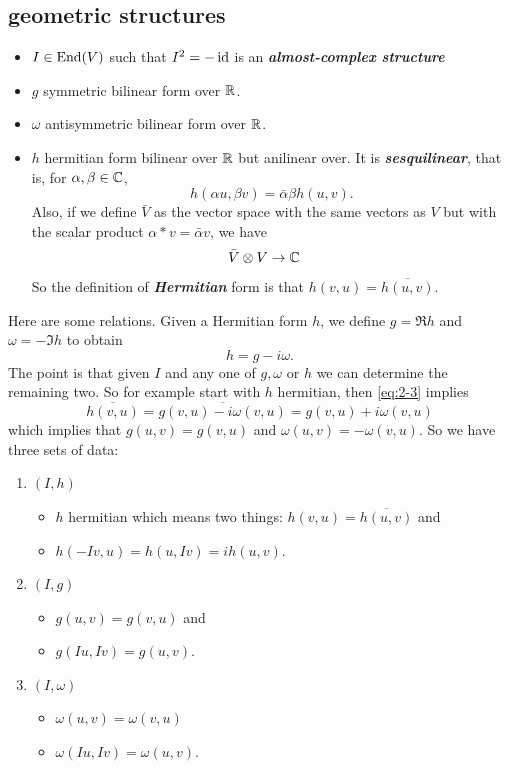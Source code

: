 \subsection{geometric structures}
\begin{defn}\leavevmode
	\begin{itemize}
		\item $I\in\operatorname{End}(V)$ such that $I^2=-\operatorname{id}$ is an \textbf{\textit{almost-complex structure}}
		\item $g$ symmetric bilinear form over $\mathbb{R}$.
		\item $\omega$ antisymmetric bilinear form over $\mathbb{R}$.
		\item $h$ hermitian form bilinear over $\mathbb{R}$ but anilinear over. It is \textbf{\textit{sesquilinear}}, that is, for $\alpha,\beta\in\mathbb{C}$,
		\[h(\alpha u,\beta v)=\bar\alpha\beta h(u,v).\]
		Also, if we define $\bar V$ as the vector space with the same vectors as $V$ but with the scalar product $\alpha * v=\bar\alpha v$, we have
		\begin{align*}
			\bar V\otimes V&\to\mathbb{C}
		\end{align*}
		So the definition of \textbf{\textit{Hermitian}} form is that $h(v,u)=\overline{h(u,v)}$.
	\end{itemize}
\end{defn}
Here are some relations. Given a Hermitian form $h$, we define $g=\Re h$ and $\omega=-\Im h$ to obtain
\begin{equation}\label{eq:2-3}
	h=g-i\omega.
\end{equation}
The point is that given $I$ and any one of $g,\omega$ or $h$ we can determine the remaining two. So for example start with $h$ hermitian, then \cref{eq:2-3} implies
\[\overline{h(v,u)}=\overline{g(v,u)-i\omega(v,u)}=g(v,u)+i\omega(v,u)\]
which implies that $g(u,v)=g(v,u)$ and $\omega(u,v)=-\omega(v,u)$.
So we have three sets of data:
\begin{enumerate}
	\item $(I,h)$
	\begin{itemize}
		\item $h$ hermitian which means two things: $h(v,u)=\overline{h(u,v)}$ and
		\item $h(-Iv,u)=h(u,Iv)=ih(u,v)$.
	\end{itemize}
	\item $(I,g)$
	\begin{itemize}
		\item $g(u,v)=g(v,u)$ and
		\item $g(Iu,Iv)=g(u,v)$.
	\end{itemize}
	\item $(I,\omega)$
	\begin{itemize}
		\item $\omega(u,v)=\omega(v,u)$
		\item $\omega(Iu,Iv)=\omega(u,v)$.
	\end{itemize}
\end{enumerate}
